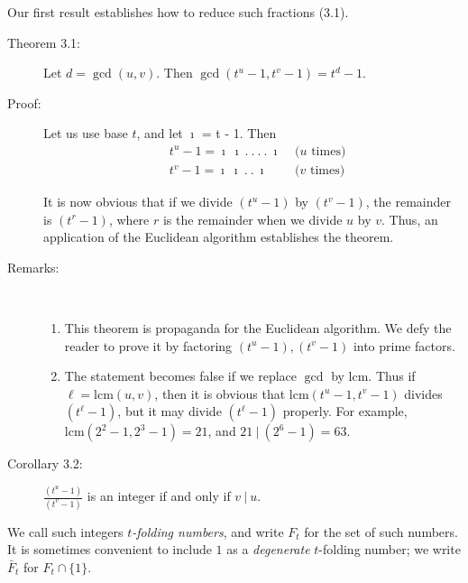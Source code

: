 Our first result establishes how to reduce such fractions (3.1).

\begin{description}

  \item[Theorem 3.1:] Let $d = \gcd(u,v)$. Then $\gcd (t^{u}-1, t^{v}-1) = t^{d}-1$.

  \item[Proof:] Let us use base $t$, and let $\imath$ = t - 1. Then
    \begin{align*}
    & t^{u}-1 = \imath\ \imath\ .\ .\ .\ .\ \imath & \text{ ($u$ times)} \\
    & t^{v}-1 = \imath\ \imath\ .\ .\ \imath       & \text{ ($v$ times)}
    \end{align*}

    It is now obvious that if we divide $(t^{u}-1)$ by $(t^{v}-1)$, the remainder is $(t^{r}-1)$, where $r$ is the remainder when we divide $u$ by $v$. Thus, an application of the Euclidean algorithm establishes the theorem.

  \item[Remarks:] $\ $
    \begin{enumerate}[\hspace{1cm}(i)]
      \item This theorem is propaganda for the Euclidean algorithm. We defy the reader to prove it by factoring $(t^{u}-1), (t^{v}-1)$ into prime factors.
      \item The statement becomes false if we replace $\gcd$ by $\text{lcm}$. Thus if $\ell = \text{lcm}(u,v)$, then it is obvious that $\text{lcm} (t^{u}-1, t^{v}-1)$ divides $(t^{\ell}-1)$, but it may divide $(t^{\ell}-1)$ properly. For example, $\text{lcm} (2^{2}-1, 2^{3}-1) = 21$, and $21\ |\ (2^{6}-1) = 63$.
    \end{enumerate}

  \item[Corollary 3.2:] $\frac{(t^{u}-1)}{(t^{v}-1)}$ is an integer if and only if $v\ |\ u$.

\end{description}

We call such integers \emph{$t$-folding numbers}, and write $F_{t}$ for the set of such numbers. It is sometimes convenient to include $1$ as a \emph{degenerate} $t$-folding number; we write $\bar{F}_{t}$ for $F_{t} \cap \{1\}$.

